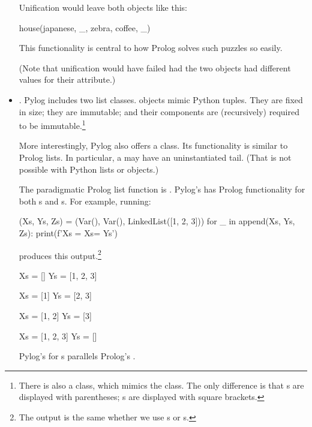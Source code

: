 \begin{itemize}[label=$\bullet$]
Unification would leave both  objects like this:
\begin{python}
   house(japanese, _, zebra, coffee, _)
\end{python}
This functionality is central to how Prolog solves such puzzles so easily.
\smallv

(Note that unification would have failed had the two  objects had different values for their  attribute.)

\item{}. Pylog includes two list classes.  objects mimic Python tuples. They are fixed in size; they are immutable; and their components are (recursively) required to be immutable.\footnote{There is also a  class, which mimics the  class. The only difference is that s  are displayed with parentheses; s  are displayed with square brackets.}
\smallv

More interestingly, Pylog also offers a  class. Its functionality is similar to Prolog lists. In particular, a  may have an uninstantiated tail. (That is not possible with Python lists or  objects.)
\smallv

The paradigmatic Prolog list function is . Pylog's  has Prolog functionality for both s and s. For example, running:

\begin{minipage}{\linewidth}
\begin{python}
(Xs, Ys, Zs) = (Var(), Var(), LinkedList([1, 2, 3]))
for _ in append(Xs, Ys, Zs):
  print(f'Xs = {Xs}\nYs = {Ys}\n')
\end{python}
\end{minipage}
produces this output.\footnote{The output is the same whether we use s or s.}
\smallv

\begin{minipage}{\linewidth}
\begin{python}
Xs = []
Ys = [1, 2, 3]

Xs = [1]
Ys = [2, 3]

Xs = [1, 2]
Ys = [3]

Xs = [1, 2, 3]
Ys = []
\end{python}
\end{minipage}
\smallv

Pylog's  for s parallels Prolog's .
\smallv


\end{itemize}
